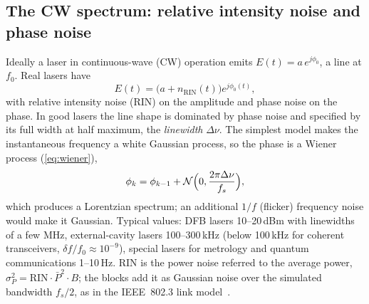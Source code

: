 \subsection{The CW spectrum: relative intensity noise and phase noise}
Ideally a laser in continuous-wave (CW) operation emits $E(t)=a\,e^{j\phi_0}$, a line at $f_0$. Real
lasers have
\begin{equation}
  E(t)=\big(a+n_{\mathrm{RIN}}(t)\big)e^{j\phi_0(t)},
\end{equation}
with relative intensity noise (RIN) on the amplitude and phase noise on the phase. In good
lasers the line shape is dominated by phase noise and specified by its full width at half
maximum, the \emph{linewidth} $\Delta\nu$. The simplest model makes the instantaneous frequency a
white Gaussian process, so the phase is a Wiener process (\cref{eq:wiener}),
\begin{equation}
  \phi_k=\phi_{k-1}+\mathcal{N}\Big(0,\frac{2\pi\Delta\nu}{f_s}\Big),
\end{equation}
which produces a Lorentzian spectrum; an additional $1/f$ (flicker) frequency noise would make
it Gaussian. Typical values: DFB lasers 10--20\,dBm with linewidths of a few MHz, external-cavity
lasers 100--300\,kHz (below 100\,kHz for coherent transceivers, $\delta f/f_0\approx10^{-9}$), special
lasers for metrology and quantum communications 1--10\,Hz. RIN is the power noise referred to the
average power, $\sigma_P^2=\mathrm{RIN}\cdot\bar P^2\cdot B$; the blocks add it as Gaussian noise over
the simulated bandwidth $f_s/2$, as in the IEEE~802.3 link model~\cite{cunningham2002}.

